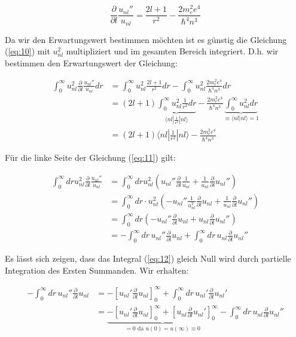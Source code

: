 \begin{equation}
  \label{eq:10}
  \frac{\partial}{\partial l}\frac{u_{nl}''}{u_{nl}} = \frac{2l+1}{r^2} - \frac{2 m_e^2e^4}{\hbar^4 n^3}
\end{equation}


Da wir den Erwartungswert bestimmen möchten ist es günstig die Gleichung (\ref{eq:10}) mit \(u_{nl}^2\) multipliziert und im gesamten Bereich integriert. D.h. wir bestimmen den Erwartungswert der Gleichung:

\begin{align}
  \label{eq:11}
  \int_0^{\infty} u_{nl}^2 \frac{\partial}{\partial l}\frac{u_{nl}''}{u_{nl}} dr &= \int_0^{\infty} u_{nl}^2 \frac{2l+1}{r^2} dr - \int_0^{\infty} u_{nl}^2\frac{2 m_e^2e^4}{\hbar^4 n^3}dr\\
&=(2l+1) \underbrace{ \int_0^{\infty} u_{nl}^2 \frac{1}{r^2}dr}_{\langle nl|\frac{1}{r^2}|nl\rangle  } -\frac{2 m_e^2e^4}{\hbar^4 n^3}\underbrace{ \int_0^{\infty} u_{nl}^2 dr}_{\equiv\langle nl|nl\rangle = 1 } \\
&=(2l+1)\langle nl|\frac{1}{r^2}|nl\rangle   -\frac{2 m_e^2e^4}{\hbar^4 n^3}
\end{align}

Für die linke Seite der Gleichung (\ref{eq:11}) gilt:

\begin{align}
  \label{eq:12}
   \int_0^{\infty}dr u_{nl}^2 \frac{\partial}{\partial l}\frac{u_{nl}''}{u_{nl}} &= \int_0^{\infty}dr u_{nl}^2\left(u_{nl}'' \frac{\partial}{\partial l}\frac{1}{u_{nl}}+ \frac{1}{u_{nl}} \frac{\partial}{\partial l}u_{nl}''  \right) \\
&= \int_0^{\infty}dr\cdot u_{nl}^2\left(- u_{nl}'' \frac{1}{u_{nl}^2}\frac{\partial}{\partial l} u_{nl}  + \frac{1}{u_{nl}} \frac{\partial}{\partial l}u_{nl}''  \right)\\
&= \int_0^{\infty}dr \left(- u_{nl}'' \frac{\partial}{\partial l} u_{nl}  + u_{nl} \frac{\partial}{\partial l}u_{nl}''  \right)\\
&= - \int_0^{\infty}dr\, u_{nl}'' \frac{\partial}{\partial l} u_{nl}  +\int_0^{\infty}dr\,  u_{nl} \frac{\partial}{\partial l}u_{nl}''
\end{align}

Es lässt sich zeigen, dass das Integral (\ref{eq:12}) gleich Null wird durch partielle Integration des Ersten Summanden. Wir erhalten:


\begin{align}
  \label{eq:13}
   - \int_0^{\infty}dr\, u_{nl}'' \frac{\partial}{\partial l} u_{nl} &= -\left[  u_{nl}'\frac{\partial}{\partial l} u_{nl}\right]_0^\infty + \int_0^{\infty}dr\, u_{nl}' \frac{\partial}{\partial l} u_{nl}'\\
 &= \underbrace{-\left[  u_{nl}'\frac{\partial}{\partial l} u_{nl}\right]_0^\infty + \left[  u_{nl}\frac{\partial}{\partial l} u_{nl}'\right]_0^\infty}_{=0 \text{ da } u(0)=u(\infty)\equiv 0} - \int_0^{\infty}dr\, u_{nl} \frac{\partial}{\partial l} u_{nl}''
\end{align}

